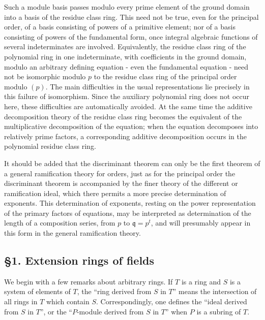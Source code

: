 \documentclass[
  12pt,
]{article}
\begin{document}
Such a module basis passes modulo every prime element of the ground
domain into a basis of the residue class ring. This need not be true,
even for the principal order, of a basis consisting of powers of a
primitive element; nor of a basis consisting of powers of the
fundamental form, once integral algebraic functions of several
indeterminates are involved. Equivalently, the residue class ring of the
polynomial ring in one indeterminate, with coefficients in the ground
domain, modulo an arbitrary defining equation - even the fundamental
equation - need not be isomorphic modulo \(p\) to the residue class ring
of the principal order modulo \((p)\). The main difficulties in the
usual representations lie precisely in this failure of isomorphism.
Since the auxiliary polynomial ring does not occur here, these
difficulties are automatically avoided. At the same time the additive
decomposition theory of the residue class ring becomes the equivalent of
the multiplicative decomposition of the equation; when the equation
decomposes into relatively prime factors, a corresponding additive
decomposition occurs in the polynomial residue class ring.

It should be added that the discriminant theorem can only be the first
theorem of a general ramification theory for orders, just as for the
principal order the discriminant theorem is accompanied by the finer
theory of the different or ramification ideal, which there permits a
more precise determination of exponents. This determination of
exponents, resting on the power representation of the primary factors of
equations, may be interpreted as determination of the length of a
composition series, from \(p\) to \(\mathfrak q=p^t\), and will
presumably appear in this form in the general ramification theory.

\subsection{§1. Extension rings of
fields}\label{extension-rings-of-fields}

We begin with a few remarks about arbitrary rings. If \(T\) is a ring
and \(S\) is a system of elements of \(T\), the ``ring derived from
\(S\) in \(T\)'' means the intersection of all rings in \(T\) which
contain \(S\). Correspondingly, one defines the ``ideal derived from
\(S\) in \(T\)'', or the ``\(P\)-module derived from \(S\) in \(T\)''
when \(P\) is a subring of \(T\).
\end{document}
